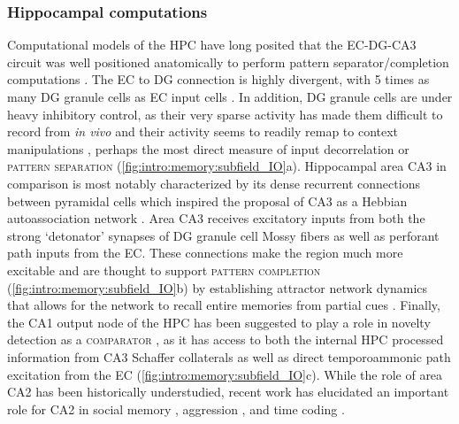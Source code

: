 \subsubsection{Hippocampal computations}
\label{sec:intro:memory:hpc_comp}
Computational models of the \ac{HPC} have long posited that the \ac{EC}-\ac{DG}-CA3 circuit was well positioned anatomically to perform pattern separator/completion computations \citep{Marr1971, Treves1994, Knierim2016}.
The \ac{EC} to \ac{DG} connection is highly divergent, with 5 times as many \ac{DG} granule cells as \ac{EC} input cells \citep{Amaral1990}.
In addition, \ac{DG} granule cells are under heavy inhibitory control, as their very sparse activity has made them difficult to record from \emph{in vivo} and their activity seems to readily remap to context manipulations \citep{Neunuebel2014, Leutgeb2007}, perhaps the most direct measure of input decorrelation or \textsc{pattern separation} (\autoref{fig:intro:memory:subfield_IO}a).
Hippocampal area CA3 in comparison is most notably characterized by its dense recurrent connections between pyramidal cells which inspired the proposal of CA3 as a Hebbian autoassociation network \citep{Marr1971}.
Area CA3 receives excitatory inputs from both the strong `detonator' synapses of \ac{DG} granule cell Mossy fibers as well as perforant path inputs from the \ac{EC}.
These connections make the region much more excitable and are thought to support \textsc{pattern completion} (\autoref{fig:intro:memory:subfield_IO}b) by establishing attractor network dynamics that allows for the network to recall entire memories from partial cues \citep{Treves1992, Neunuebel2014}.
Finally, the CA1 output node of the \ac{HPC} has been suggested to play a role in novelty detection as a \textsc{comparator} \citep{Vinogradova2001, Lisman2001}, as it has access to both the internal \ac{HPC} processed information from CA3 Schaffer collaterals as well as direct temporoammonic path excitation from the \ac{EC} (\autoref{fig:intro:memory:subfield_IO}c).
While the role of area CA2 has been historically understudied, recent work has elucidated an important role for CA2 in social memory \citep{Hitti2014}, aggression \citep{Wersinger2002}, and time coding \citep{Mankin2015}.

